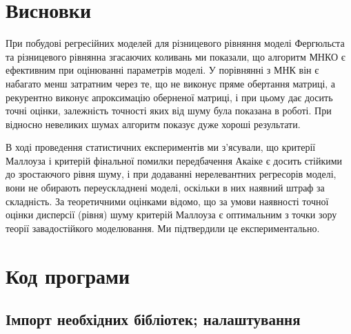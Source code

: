 \documentclass[11pt]{article}
\begin{document}
    \newpage
    \section{Висновки}\label{ux432ux438ux441ux43dux43eux432ux43aux438}
    
При побудові регресійних моделей для різницевого рівняння моделі Фергюльста та різницевого рівнянна згасаючих коливань ми показали, що алгоритм МНКО є ефективним при оцінюванні параметрів моделі. У порівнянні з МНК він є набагато менш затратним через те, що не виконує пряме обертання матриці, а рекурентно виконує апроксимацію оберненої матриці, і при цьому дає досить точні оцінки, залежність точності яких від шуму була показана в роботі. При відносно невеликих шумах алгоритм показує дуже хороші результати.

В ході проведення статистичних експериментів ми з'ясували, що критерії Маллоуза і критерій фінальної помилки передбачення Акаіке є досить стійкими до зростаючого рівня шуму, і при додаванні нерелевантних регресорів моделі, вони не обирають переускладнені моделі, оскільки в них наявний штраф за складність. За теоретичними оцінками відомо, що за умови наявності точної оцінки дисперсії (рівня) шуму критерій Маллоуза є оптимальним з точки зору теорії завадостійкого моделювання. Ми підтвердили це експериментально.

    \newpage   
    \section{Код
програми}\label{ux43aux43eux434-ux43fux440ux43eux433ux440ux430ux43cux438}

    \subsection{Імпорт необхідних бібліотек;
налаштування}\label{ux456ux43cux43fux43eux440ux442-ux43dux435ux43eux431ux445ux456ux434ux43dux438ux445-ux431ux456ux431ux43bux456ux43eux442ux435ux43a-ux43dux430ux43bux430ux448ux442ux443ux432ux430ux43dux43dux44f}
\end{document}
